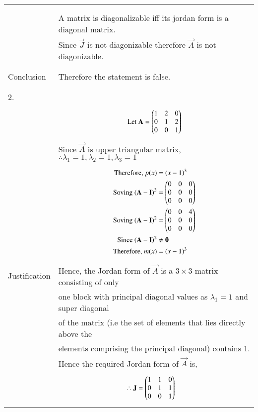 \begin{longtable}{|l|l|}
{\begin{align*}
\end{align*}}\\
&A matrix is diagonalizable iff its jordan form is a diagonal matrix.\\
&Since $\vec{J}$ is not diagonizable therefore $\vec{A}$ is not diagonizable.\\
&\\
\hline
&\\
Conclusion&Therefore the statement is false.\\
&\\
\hline
\pagebreak
\hline
&\\
2.&\\
&\parbox{6cm}{\begin{align*}
    \mbox{Let }\mathbf{A}&=\begin{pmatrix}1&2&0\\0&1&2\\0&0&1\end{pmatrix}\\
\end{align*}}\\
&Since $\vec{A}$ is upper triangular matrix, $\therefore \lambda_{1}=1,\lambda_{2}=1,\lambda_{3}=1$ \\
&\parbox{6cm}{\begin{align*}
    \mbox{Therefore, }p(x)&=(x-1)^3\\
    \mbox{Soving }(\mathbf{A}-\mathbf{I})^3&=\begin{pmatrix}0&0&0\\0&0&0\\0&0&0\end{pmatrix}\\
    \mbox{Soving }(\mathbf{A}-\mathbf{I})^2&=\begin{pmatrix}0&0&4\\0&0&0\\0&0&0\end{pmatrix}\\
    \mbox{Since }(\mathbf{A}-\mathbf{I})^2&\neq \mathbf{0}\\
    \mbox{Therefore, }m(x)&=(x-1)^3\\
\end{align*}}\\
Justification&Hence, the Jordan form of $\vec{A}$ is a $3 \times 3$ matrix consisting of only\\
&one block with principal diagonal values as $\lambda_1 = 1$ and super diagonal\\
&of the matrix (i.e the set of elements that lies directly above the\\
&elements comprising the principal diagonal) contains 1.\\
&Hence the required Jordan form of $\vec{A}$ is,\\
&\parbox{6cm}{\begin{align*}
    \therefore \vec{J}&=\myvec{1&1&0\\0&1&1\\0&0&1}

\end{align*}}
\end{longtable}
